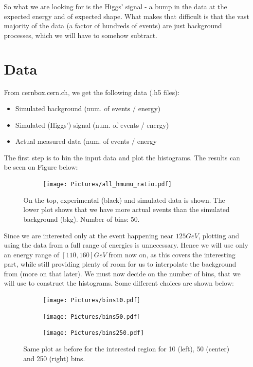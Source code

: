 \documentclass{article}
\begin{document}
So what we are looking for is the Higgs' signal - a bump in the data at the expected energy and of expected shape. What makes that difficult is that the vast majority of the data (a factor of hundreds of events) are just background processes, which we will have to somehow subtract. 
\section*{Data}
From cernbox.cern.ch, we get the following data (.h5 files):
\begin{itemize}
\item Simulated background (num. of events / energy)
\item Simulated (Higgs') signal (num. of events / energy)
\item Actual measured data (num. of events / energy
\end{itemize}
The first step is to bin the input data and plot the histograms. The results can be seen on Figure below:
\begin{figure}[H]
\centering
\begin{subfigure}{.7\textwidth}
\texttt{[image: Pictures/all\_hmumu\_ratio.pdf]}
\end{subfigure}
\caption*{On the top, experimental (black) and simulated data is shown. The lower plot shows that we have more actual events than the simulated background (bkg). Number of bins: 50.}
\end{figure}
Since we are interested only at the event happening near $125 GeV$, plotting and using the data from a full range of energies is unnecessary. Hence we will use only an energy range of $[110,160] GeV$ from now on, as this covers the interesting part, while still providing plenty of room for us to interpolate the background from (more on that later).
We must now decide on the number of bins, that we will use to construct the histograms. Some different choices are shown below:
\begin{figure}[H]
\centering
\begin{subfigure}{.32\textwidth}
\texttt{[image: Pictures/bins10.pdf]}
\end{subfigure}
\begin{subfigure}{.32\textwidth}
\texttt{[image: Pictures/bins50.pdf]}
\end{subfigure}
\begin{subfigure}{.32\textwidth}
\texttt{[image: Pictures/bins250.pdf]}
\end{subfigure}
\caption*{Same plot as before for the interested region for 10 (left), 50 (center) and 250 (right) bins.}
\label{fig:diffBins}
\end{figure}
\end{document}
